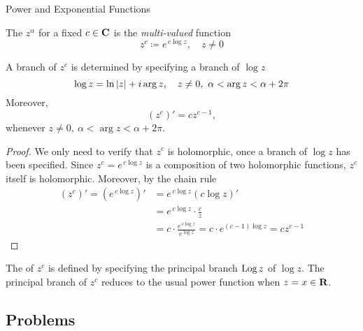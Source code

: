 \vspace*{2em}

\begin{mdframed}
\begin{center}
{\Large Power and Exponential Functions}
\end{center}
\end{mdframed}

\begin{definition}
The  $z^\alpha$ for a fixed $c \in \mathbf C$ is the \emph{multi-valued} function
\[z^c \coloneqq e^{\,c\log z},\quad z \neq 0\]
\end{definition}

\vspace*{1em}

\begin{proposition}[Branches of $z^c$]
A branch of $z^c$ is determined by specifying a branch of $\log z$
\[\log z = \ln\left\lvert z\right\rvert + i\arg z,\quad z \neq 0,\ \alpha < \arg z < \alpha + 2\pi\]
Moreover,
\[(z^c)' = c z^{c-1},\]
whenever $z \neq 0,\ \alpha < \arg z < \alpha + 2\pi$.
\end{proposition}
\begin{proof}
We only need to verify that $z^c$ is holomorphic, once a branch of $\log z$ has been specified. Since $z^c = e^{\,c\log z}$ is a composition of two holomorphic functions, $z^c$ itself is holomorphic. Moreover, by the chain rule
\begin{align*}
(z^c)' = (e^{\,c\log z})' &= e^{\,c\log z}(c\log z)'\\[0.5em]
&= e^{\,c\log z}\cdot \frac{c}{z}\\[0.5em]
&= c\cdot \frac{e^{\,c\log z}}{e^{\log z}} = c\cdot e^{(c-1)\log z} = cz^{c-1}
\end{align*}
\end{proof}


\begin{discussion}
The  of $z^c$ is defined by specifying the principal branch $\operatorname{Log} z$ of $\log z$. The principal branch of $z^c$ reduces to the usual power function when $z =  x \in \mathbf R$.
\end{discussion}

\vspace*{2em}

\subsection{Problems}
\vspace{0.1in}

